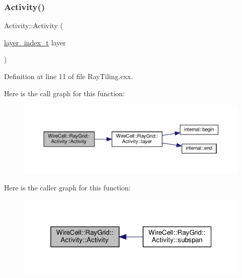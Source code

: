 \subsubsection{\texorpdfstring{Activity()}{Activity()}\hspace{0.1cm}{\footnotesize\ttfamily [1/3]}}
{\footnotesize\ttfamily Activity\+::\+Activity (\begin{DoxyParamCaption}\item[{\hyperlink{namespace_wire_cell_1_1_ray_grid_ab7562e54b58eede813d5b70b5eb85812}{layer\+\_\+index\+\_\+t}}]{layer }\end{DoxyParamCaption})}



Definition at line 11 of file Ray\+Tiling.\+cxx.

Here is the call graph for this function\+:
\nopagebreak
\begin{figure}[H]
\begin{center}
\leavevmode
\includegraphics[width=350pt]{class_wire_cell_1_1_ray_grid_1_1_activity_aed4ac25a6f5ce1a5933b04f04858597e_cgraph}
\end{center}
\end{figure}
Here is the caller graph for this function\+:
\nopagebreak
\begin{figure}[H]
\begin{center}
\leavevmode
\includegraphics[width=320pt]{class_wire_cell_1_1_ray_grid_1_1_activity_aed4ac25a6f5ce1a5933b04f04858597e_icgraph}
\end{center}
\end{figure}
\mbox{\label{class_wire_cell_1_1_ray_grid_1_1_activity_abc20e03d0590c69828e595867a96b956}} 
